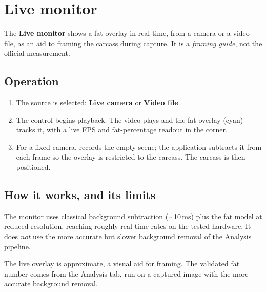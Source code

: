 \chapter{Live monitor}


\vspace{4pt}
The \textbf{Live monitor} shows a fat overlay in real time, from a camera or a
video file, as an aid to framing the carcass during capture. It is a
\emph{framing guide}, not the official measurement.

\section{Operation}


\begin{enumerate}[leftmargin=1.4em,itemsep=3pt]
  \item The source is selected: \textbf{Live camera} or \textbf{Video file}.
  \item The  control begins playback. The video plays and the fat
        overlay (cyan) tracks it, with a live FPS and fat-percentage readout in
        the corner.
  \item For a fixed camera,  records the empty scene; the
        application subtracts it from each frame so the overlay is restricted to
        the carcass. The carcass is then positioned.
\end{enumerate}

\section{How it works, and its limits}

The monitor uses classical background subtraction ($\sim$10\,ms) plus the fat
model at reduced resolution, reaching roughly real-time rates on the tested
hardware. It does \emph{not} use the more accurate but slower background removal
of the Analysis pipeline.

\begin{caution}[title={Framing guide, not the validated number}]
The live overlay is approximate, a visual aid for framing. The validated fat
number comes from the Analysis tab, run on a captured image with the more accurate
background removal.
\end{caution}
